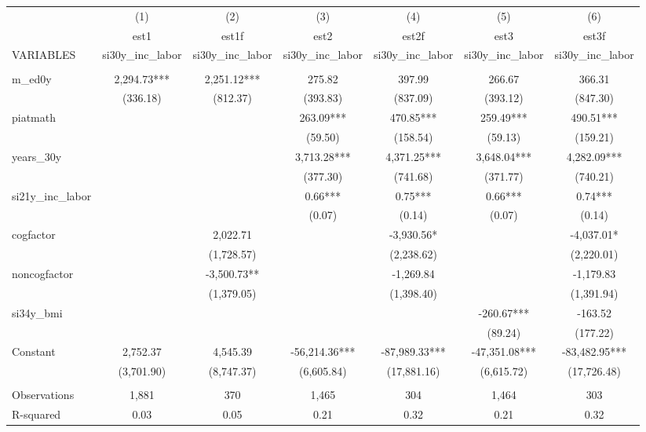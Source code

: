 \begin{tabular}{lcccccc} \hline
 & (1) & (2) & (3) & (4) & (5) & (6) \\
 & est1 & est1f & est2 & est2f & est3 & est3f \\
VARIABLES & si30y\_inc\_labor & si30y\_inc\_labor & si30y\_inc\_labor & si30y\_inc\_labor & si30y\_inc\_labor & si30y\_inc\_labor \\ \hline
 &  &  &  &  &  &  \\
m\_ed0y & 2,294.73*** & 2,251.12*** & 275.82 & 397.99 & 266.67 & 366.31 \\
 & (336.18) & (812.37) & (393.83) & (837.09) & (393.12) & (847.30) \\
piatmath &  &  & 263.09*** & 470.85*** & 259.49*** & 490.51*** \\
 &  &  & (59.50) & (158.54) & (59.13) & (159.21) \\
years\_30y &  &  & 3,713.28*** & 4,371.25*** & 3,648.04*** & 4,282.09*** \\
 &  &  & (377.30) & (741.68) & (371.77) & (740.21) \\
si21y\_inc\_labor &  &  & 0.66*** & 0.75*** & 0.66*** & 0.74*** \\
 &  &  & (0.07) & (0.14) & (0.07) & (0.14) \\
cogfactor &  & 2,022.71 &  & -3,930.56* &  & -4,037.01* \\
 &  & (1,728.57) &  & (2,238.62) &  & (2,220.01) \\
noncogfactor &  & -3,500.73** &  & -1,269.84 &  & -1,179.83 \\
 &  & (1,379.05) &  & (1,398.40) &  & (1,391.94) \\
si34y\_bmi &  &  &  &  & -260.67*** & -163.52 \\
 &  &  &  &  & (89.24) & (177.22) \\
Constant & 2,752.37 & 4,545.39 & -56,214.36*** & -87,989.33*** & -47,351.08*** & -83,482.95*** \\
 & (3,701.90) & (8,747.37) & (6,605.84) & (17,881.16) & (6,615.72) & (17,726.48) \\
 &  &  &  &  &  &  \\
Observations & 1,881 & 370 & 1,465 & 304 & 1,464 & 303 \\
 R-squared & 0.03 & 0.05 & 0.21 & 0.32 & 0.21 & 0.32 \\ \hline
\end{tabular}
